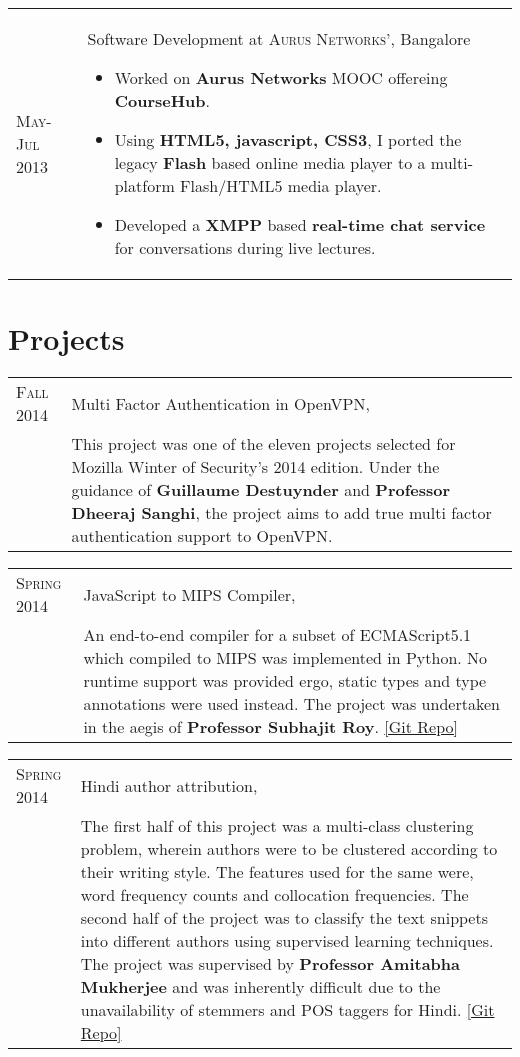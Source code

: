 \documentclass[a4paper,10pt]{article} %
\newcommand{\project}[3]{
    \begin{tabular}{>{\raggedleft}p{2.2cm}|p{15cm}}
        \textsc{#1} & #2 \\
                    & \footnotesize{#3} \\
    \end{tabular}
}
\newcommand{\workexperience}[3]{
    \begin{tabular}{>{\raggedleft}p{2.2cm}|p{15cm}}
        \textsc{#1} & #2
                    \footnotesize{#3}
    \end{tabular}
}
\begin{document}
\workexperience {May-Jul 2013}
         {Software Development at \textsc{Aurus Networks'}, Bangalore}
         {
            \begin{itemize}[leftmargin=*]
                \item Worked on \textbf{Aurus Networks} MOOC offereing \textbf{CourseHub}.
                \item Using \textbf{HTML5, javascript, CSS3}, I ported the legacy
                      \textbf{Flash} based online media player to a multi-platform
                      Flash/HTML5 media player.
                  \item Developed a \textbf{XMPP} based \textbf{real-time chat service} for
                      conversations during live lectures.
            \end{itemize}
        }

\section{Projects}

\project {Fall 2014}
         {Multi Factor Authentication in OpenVPN, \textsc{\raggedright Mozilla Winter of Security}}
         {This project was one of the eleven projects selected for Mozilla Winter of Security's 2014 edition.
         Under the guidance of \textbf{Guillaume Destuynder} and \textbf{Professor Dheeraj Sanghi},
         the project aims to add true multi factor authentication support to OpenVPN.}

\project {Spring 2014}
         {JavaScript to MIPS Compiler, \textsc{\raggedright Compilers}}
         {An end-to-end compiler for a subset of ECMAScript5.1 which compiled to MIPS was implemented in Python.
          No runtime support was provided ergo, static types and type annotations were used instead.
          The project was undertaken in the aegis of \textbf{Professor Subhajit Roy}.
          \href{https://github.com/srijanshetty/javascript-compiler} {[Git Repo]}}

\project {Spring 2014}
         {Hindi author attribution, \textsc{\raggedright Artificial Intelligence}}
         {The first half of this project was a multi-class clustering problem,
          wherein authors were to be clustered according to their writing style.
          The features used for the same were, word frequency counts and collocation
          frequencies.  The second half of the project was to classify the text snippets
          into different authors using supervised learning techniques.
          The project was supervised by \textbf{Professor Amitabha Mukherjee} and was
          inherently difficult due to the unavailability of stemmers and POS taggers for Hindi.
          \href{https://github.com/srijanshetty/author-attribution} {[Git Repo]}}
\end{document}
